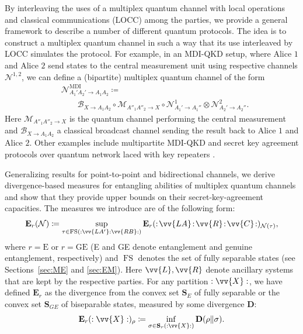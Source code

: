 \documentclass[aps,pra,twocolumn,superscriptaddress,longbibliography]{revtex4-1}
\def\FS{\operatorname{FS}}
\newcommand{\mc}[1]{\mathcal{#1}}
\newcommand{\tf}[1]{\textbf{#1}}
\begin{document}
By interleaving the uses of a multiplex quantum channel with local operations and classical communications (LOCC) among the parties, we provide a general framework to describe a number of different quantum protocols. The idea is to construct a multiplex quantum channel in such a way that its use interleaved by LOCC simulates the protocol. For example, in an MDI-QKD setup, where Alice $1$ and Alice $2$ send states to the central measurement unit using respective channels ${\mc N}^{1,2}$, we can define a (bipartite) multiplex quantum channel of the form
\begin{align}
&\mc{N}^{\text{MDI}}_{A_1'A_2'\to A_1A_2}\coloneqq \nonumber\\ 
&\qquad \mc{B}_{X\to A_1A_2}\circ\mc{M}_{A''_1A''_2\to X}\circ{\mc N}^1_{A_1'\to A_1''}\otimes{\mc N}^2_{A_2'\to A_2''}.
\end{align}
Here  $\mc{M}_{A''_1A''_2\to X}$ is the quantum channel performing the central measurement  and $\mc{B}_{X\to A_1A_2}$ a classical broadcast channel sending the result back to Alice $1$ and Alice $2$. Other examples include multipartite  MDI-QKD and secret key agreement protocols over quantum network laced with key repeaters \cite{bauml2015limitations,CM17}. 


Generalizing results for point-to-point \cite{PLOB15,WTB16,CM17} and bidirectional \cite{D18thesis,DBW17,BDW18} channels, we derive divergence-based measures for entangling abilities of multiplex quantum channels and show that they provide upper bounds on their secret-key-agreement capacities. The measures we introduce are of the following form: 
\begin{equation}
\tf{E}_{r}(\mc{N})\coloneqq \sup_{\tau\in\FS(:\vv{LA'}:\vv{RB}:)}\tf{E}_{r}(:\!\vv{LA}\!:\!\vv{R}\!:\!\vv{C}\!:)_{\mc{N}(\tau)},
\end{equation} 
where $r=\text{E}$ or $r=\text{GE}$ (E and GE denote entanglement and genuine entanglement, respectively) and $\FS$ denotes the set of fully separable states (see Sections~\ref{sec:ME} and \ref{sec:EM}). Here $\vv{L},\vv{R}$ denote ancillary systems that are kept by the respective parties. For any partition $:\vv{X}:$, we have defined $\tf{E}_{r}$ as the divergence from the convex set $\tf{S}_E$ of fully separable  or the convex set $\tf{S}_{GE}$ of biseparable states, measured by some divergence $\tf{D}$:
\begin{equation}
\tf{E}_{r}(:\vv{X}:)_{\rho}\coloneqq \inf_{\sigma\in\tf{S}_r(:\vv{X}:)}\tf{D}(\rho\Vert\sigma).
\end{equation} 
\end{document}
